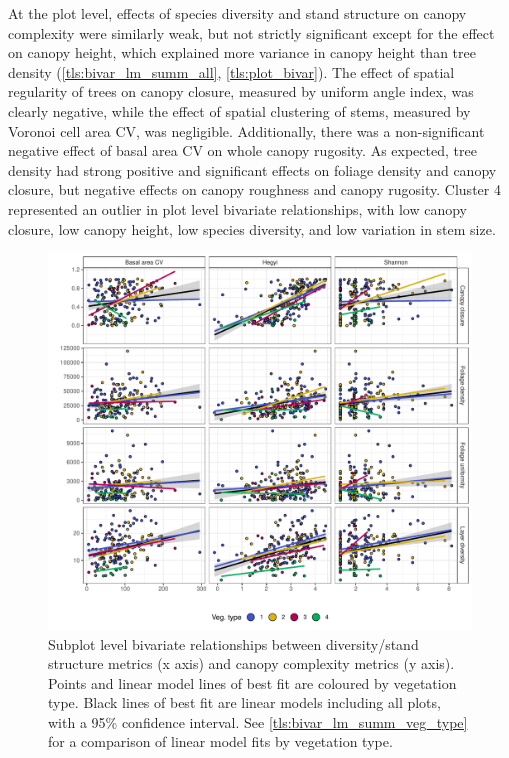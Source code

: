 \begin{refsection}
At the plot level, effects of species diversity and stand structure on canopy complexity were similarly weak, but not strictly significant except for the effect on canopy height, which explained more variance in canopy height than tree density (\autoref{tls:bivar_lm_summ_all}, \autoref{tls:plot_bivar}). The effect of spatial regularity of trees on canopy closure, measured by uniform angle index, was clearly negative, while the effect of spatial clustering of stems, measured by Voronoi cell area CV, was negligible. Additionally, there was a non-significant negative effect of basal area CV on whole canopy rugosity. As expected, tree density had strong positive and significant effects on foliage density and canopy closure, but negative effects on canopy roughness and canopy rugosity. Cluster 4 represented an outlier in plot level bivariate relationships, with low canopy closure, low canopy height, low species diversity, and low variation in stem size.



\begin{figure}
	\includegraphics[width=\linewidth]{img/bivar_subplot}
	\caption[Bivariate plots comparing diversity, stand structure and canopy complexity]{Subplot level bivariate relationships between diversity/stand structure metrics (x axis) and canopy complexity metrics (y axis). Points and linear model lines of best fit are coloured by vegetation type. Black lines of best fit are linear models including all plots, with a 95\% confidence interval. See \autoref{tls:bivar_lm_summ_veg_type} for a comparison of linear model fits by vegetation type.}
	\label{tls:subplot_bivar}
\end{figure}


\end{refsection}
